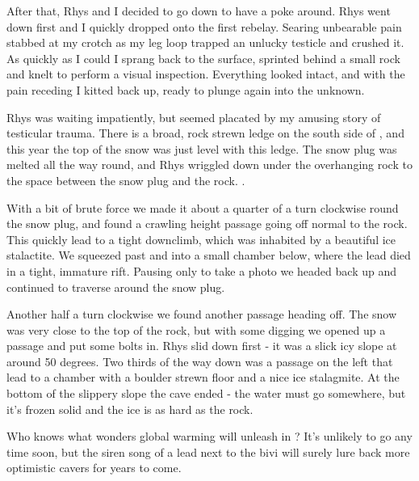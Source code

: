 After that, Rhys and I decided to go down to have a poke around. Rhys went down first and I quickly dropped onto the first rebelay. Searing unbearable pain stabbed at my crotch as my leg loop trapped an unlucky testicle and crushed it. As quickly as I could I sprang back to the surface, sprinted behind a small rock and knelt to perform a visual inspection. Everything looked intact, and with the pain receding I kitted back up, ready to plunge again into the unknown.


Rhys was waiting impatiently, but seemed placated by my amusing story of testicular trauma. There is a broad, rock strewn ledge on the south side of , and this year the top of the snow was just level with this ledge. The snow plug was melted all the way round, and Rhys wriggled down under the overhanging rock to the space between the snow plug and the rock. .

With a bit of brute force we made it about a quarter of a turn clockwise round the snow plug, and found a crawling height passage going off normal to the rock. This quickly lead to a tight downclimb, which was inhabited by a beautiful ice stalactite. We squeezed past and into a small chamber below, where the lead died in a tight, immature rift. Pausing only to take a photo we headed back up and continued to traverse around the snow plug.

Another half a turn clockwise we found another passage heading off. The snow was very close to the top of the rock, but with some digging we opened up a passage and put some bolts in. Rhys slid down first - it was a slick icy slope at around 50 degrees. Two thirds of the way down was a passage on the left that lead to a chamber with a boulder strewn floor and a nice ice stalagmite. At the bottom of the slippery slope the cave ended - the water must go somewhere, but it's frozen solid and the ice is as hard as the rock.

Who knows what wonders global warming will unleash in ? It's unlikely to go any time soon, but the siren song of a lead next to the bivi will surely lure back more optimistic cavers for years to come.

